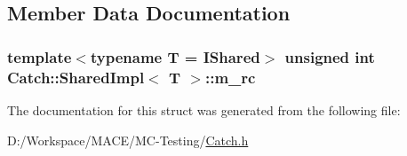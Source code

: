 \subsection{Member Data Documentation}
\subsubsection[{\texorpdfstring{m\+\_\+rc}{m_rc}}]{\setlength{\rightskip}{0pt plus 5cm}template$<$typename T = I\+Shared$>$ unsigned {\bf int} {\bf Catch\+::\+Shared\+Impl}$<$ T $>$\+::m\+\_\+rc\hspace{0.3cm}{\ttfamily [mutable]}}\hypertarget{struct_catch_1_1_shared_impl_a7e71ef1985b85aa41a1632f932a96bcb}{}\label{struct_catch_1_1_shared_impl_a7e71ef1985b85aa41a1632f932a96bcb}


The documentation for this struct was generated from the following file\+:\begin{DoxyCompactItemize}
\item 
D\+:/\+Workspace/\+M\+A\+C\+E/\+M\+C-\/\+Testing/\hyperlink{_catch_8h}{Catch.\+h}\end{DoxyCompactItemize}
